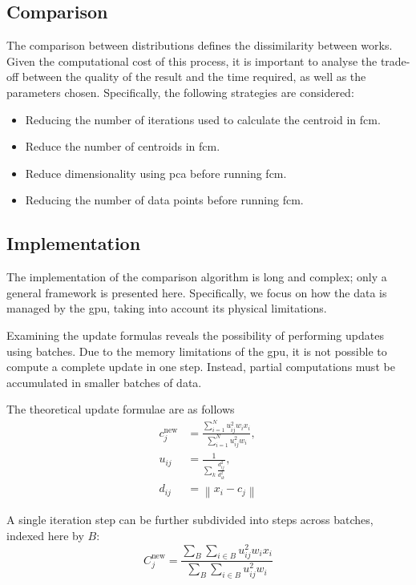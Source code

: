 \begin{toReview}
    \section{Comparison} The comparison between distributions defines the dissimilarity between works. Given the computational cost of this process, it is important to analyse the trade-off between the quality of the result and the time required, as well as the parameters chosen. Specifically, the following strategies are considered:
    \begin{itemize}
    	\item Reducing the number of iterations used to calculate the centroid in \gls{fcm}.
    	\item Reduce the number of centroids in \gls{fcm}.
    	\item Reduce dimensionality using \gls{pca} before running \gls{fcm}.
    	\item Reducing the number of data points before running \gls{fcm}.
    \end{itemize}

	\subsection{Implementation} The implementation of the comparison algorithm is long and complex; only a general framework is presented here. Specifically, we focus on how the data is managed by the \gls{gpu}, taking into account its physical limitations.

	\noindent Examining the update formulas reveals the possibility of performing updates using batches. Due to the memory limitations of the \gls{gpu}, it is not possible to compute a complete update in one step. Instead, partial computations must be accumulated in smaller batches of data.

	\noindent The theoretical update formulae are as follows
	\begin{align*}
		c_{j}^\text{new} &= \frac{\sum_{i=1}^N u_{ij}^2w_ix_i}{\sum_{i=1}^N u_{ij}^2w_i}, \\
		u_{ij} &= \frac{1}{\sum_k\frac{d_{ij}^2}{d_{ik}^2}}, \\
		d_{ij} &= \left\|x_i - c_{j}\right\|
	\end{align*}

	\noindent A single iteration step can be further subdivided into steps across batches, indexed here by $B$:
	\begin{equation*}
		C_{j}^\text{new} = \frac{\sum_{B}\sum_{i\in B} u_{ij}^2w_ix_i}{\sum_{B}\sum_{i\in B} u_{ij}^2w_i}
	\end{equation*}


\end{toReview}
